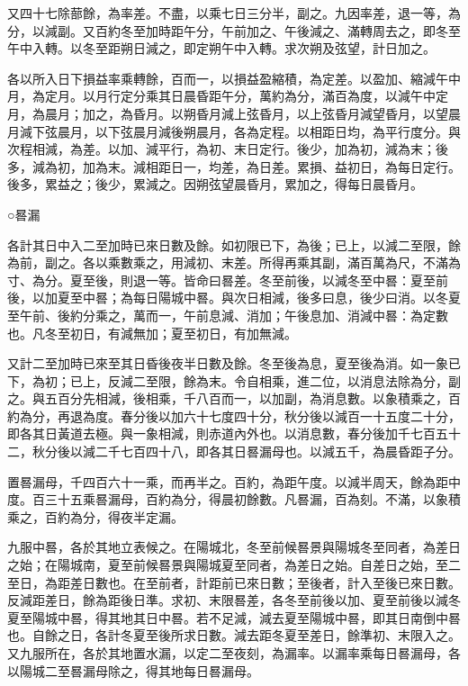 \begin{pinyinscope}
 又四十七除蔀餘，為率差。不盡，以乘七日三分半，副之。九因率差，退一等，為分，以減副。又百約冬至加時距午分，午前加之、午後減之、滿轉周去之，即冬至午中入轉。以冬至距朔日減之，即定朔午中入轉。求次朔及弦望，計日加之。



 各以所入日下損益率乘轉餘，百而一，以損益盈縮積，為定差。以盈加、縮減午中月，為定月。以月行定分乘其日晨昏距午分，萬約為分，滿百為度，以減午中定月，為晨月；加之，為昏月。以朔昏月減上弦昏月，以上弦昏月減望昏月，以望晨月減下弦晨月，以下弦晨月減後朔晨月，各為定程。以相距日均，為平行度分。與次程相減，為差。以加、減平行，為初、末日定行。後少，加為初，減為末；後多，減為初，加為末。減相距日一，均差，為日差。累損、益初日，為每日定行。後多，累益之；後少，累減之。因朔弦望晨昏月，累加之，得每日晨昏月。



 ○晷漏



 各計其日中入二至加時已來日數及餘。如初限已下，為後；已上，以減二至限，餘為前，副之。各以乘數乘之，用減初、末差。所得再乘其副，滿百萬為尺，不滿為寸、為分。夏至後，則退一等。皆命曰晷差。冬至前後，以減冬至中晷：夏至前後，以加夏至中晷；為每日陽城中晷。與次日相減，後多曰息，後少曰消。以冬夏至午前、後約分乘之，萬而一，午前息減、消加；午後息加、消減中晷：為定數也。凡冬至初日，有減無加；夏至初日，有加無減。



 又計二至加時已來至其日昏後夜半日數及餘。冬至後為息，夏至後為消。如一象已下，為初；已上，反減二至限，餘為末。令自相乘，進二位，以消息法除為分，副之。與五百分先相減，後相乘，千八百而一，以加副，為消息數。以象積乘之，百約為分，再退為度。春分後以加六十七度四十分，秋分後以減百一十五度二十分，即各其日黃道去極。與一象相減，則赤道內外也。以消息數，春分後加千七百五十二，秋分後以減二千七百四十八，即各其日晷漏母也。以減五千，為晨昏距子分。



 置晷漏母，千四百六十一乘，而再半之。百約，為距午度。以減半周天，餘為距中度。百三十五乘晷漏母，百約為分，得晨初餘數。凡晷漏，百為刻。不滿，以象積乘之，百約為分，得夜半定漏。



 九服中晷，各於其地立表候之。在陽城北，冬至前候晷景與陽城冬至同者，為差日之始；在陽城南，夏至前候晷景與陽城夏至同者，為差日之始。自差日之始，至二至日，為距差日數也。在至前者，計距前已來日數；至後者，計入至後已來日數。反減距差日，餘為距後日準。求初、末限晷差，各冬至前後以加、夏至前後以減冬夏至陽城中晷，得其地其日中晷。若不足減，減去夏至陽城中晷，即其日南倒中晷也。自餘之日，各計冬夏至後所求日數。減去距冬夏至差日，餘準初、末限入之。又九服所在，各於其地置水漏，以定二至夜刻，為漏率。以漏率乘每日晷漏母，各以陽城二至晷漏母除之，得其地每日晷漏母。




\end{pinyinscope}
